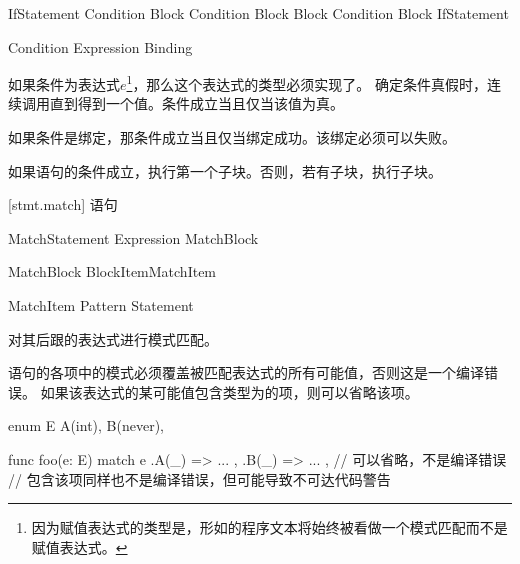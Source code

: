 \begin{bnf}{IfStatement}
     Condition Block \br
     Condition Block  Block \br
     Condition Block  IfStatement
\end{bnf}

\begin{bnf}{Condition}
    Expression \br
    Binding
\end{bnf}

\pnum
如果条件为表达式$e$\footnote{因为赋值表达式的类型是，形如的程序文本将始终被看做一个模式匹配而不是赋值表达式。}，那么这个表达式的类型必须实现了。
确定条件真假时，连续调用直到得到一个值。条件成立当且仅当该值为真。

\pnum
如果条件是绑定，那条件成立当且仅当绑定成功。该绑定必须可以失败。

\pnum
如果语句的条件成立，执行第一个子块。否则，若有子块，执行子块。

[stmt.match]{ 语句}

\begin{bnf}{MatchStatement}
     Expression MatchBlock
\end{bnf}

\begin{bnf}{MatchBlock}
    \terminal{\{} BlockItem\bnfs MatchItem\bnfp \terminal{\}}
\end{bnf}

\begin{bnf}{MatchItem}
    Pattern \terminal{->} Statement
\end{bnf}

\pnum
{}对其后跟的表达式进行模式匹配。

\pnum
{}语句的各项中的模式必须覆盖被匹配表达式的所有可能值，否则这是一个编译错误。
如果该表达式的某可能值包含类型为的项，则可以省略该项。

\enterexample
\begin{codeblock}

enum E {
    A(int),
    B(never),
}

func foo(e: E) {
    match e {
        .A(_) => { ... },
        .B(_) => { ... }, // 可以省略，不是编译错误
                          // 包含该项同样也不是编译错误，但可能导致不可达代码警告
    }
}

\end{codeblock}
\exitexample

